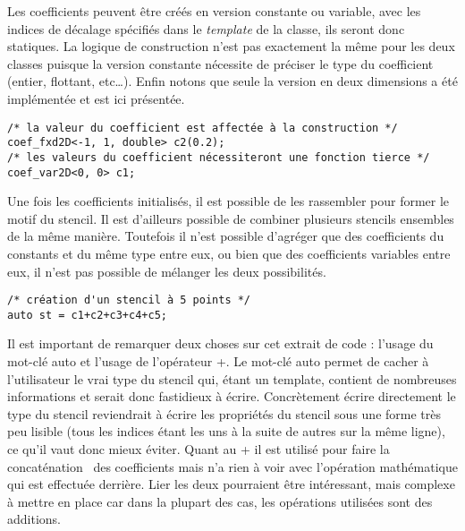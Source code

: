 Les coefficients peuvent être créés en version constante ou variable, avec les indices de décalage spécifiés dans le \emph{template} de la classe, ils seront donc statiques. La logique de construction n'est pas exactement la même pour les deux classes puisque la version constante nécessite de préciser le type du coefficient (entier, flottant, etc\ldots). Enfin notons que seule la version en deux dimensions a été implémentée et est ici présentée.
\begin{verbatim}
/* la valeur du coefficient est affectée à la construction */
coef_fxd2D<-1, 1, double> c2(0.2);
/* les valeurs du coefficient nécessiteront une fonction tierce */
coef_var2D<0, 0> c1;
\end{verbatim}

Une fois les coefficients initialisés, il est possible de les rassembler pour former le motif du stencil. Il est d'ailleurs possible de combiner plusieurs stencils ensembles de la même manière. Toutefois il n'est possible d'agréger que des coefficients du constants et du même type entre eux, ou bien que des coefficients variables entre eux, il n'est pas possible de mélanger les deux possibilités.
\begin{verbatim}
/* création d'un stencil à 5 points */
auto st = c1+c2+c3+c4+c5; 
\end{verbatim}
Il est important de remarquer deux choses sur cet extrait de code : l'usage du mot-clé \textsf{auto} et l'usage de l'opérateur \textsf{+}. Le mot-clé \textsf{auto} permet de cacher à l'utilisateur le vrai type du stencil qui, étant un template, contient de nombreuses informations et serait donc fastidieux à écrire. Concrètement écrire directement le type du stencil reviendrait à écrire les propriétés du stencil sous une forme très peu lisible (tous les indices étant les uns à la suite de autres sur la même ligne), ce qu'il vaut donc mieux éviter. Quant au \textsf{+} il est utilisé pour faire la \og concaténation \fg~des coefficients mais n'a rien à voir avec l'opération mathématique qui est effectuée derrière. Lier les deux pourraient être intéressant, mais complexe à mettre en place car dans la plupart des cas, les opérations utilisées sont des additions.

